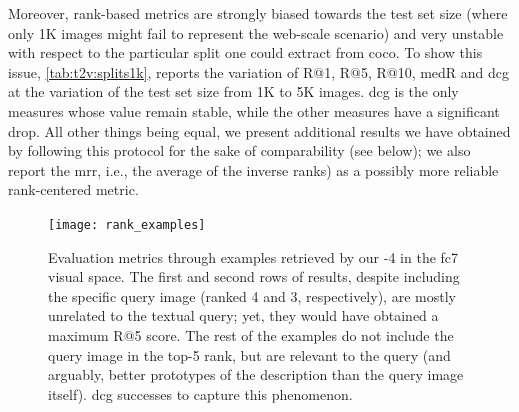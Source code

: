 Moreover, rank-based metrics are strongly biased towards the test set size (where only 1K images might fail to represent the web-scale scenario) and very unstable with respect to the particular split one could extract from \gls{coco}.
To show this issue, \ref{tab:t2v:splits1k}, reports the variation of R@1, R@5, R@10, \gls{medR} and \gls{dcg} at the variation of the test set size from 1K to 5K images.
\gls{dcg} is the only measures whose value remain stable, while the other measures have a significant drop.
All other things being equal, we present additional results we have obtained by following this protocol for the sake of comparability (see below);
we also report the \acrfull{mrr}, i.e.,  the average of the inverse ranks) as a possibly more reliable rank-centered metric.

\begin{figure}
 \texttt{[image: rank\_examples]}
 \caption{Evaluation metrics through examples retrieved by our \widedeepttv{}-4 in the fc7 visual space.
The first and second rows of results, despite including the specific query image (ranked 4 and 3, respectively), are mostly unrelated to the textual query;
 yet, they would have obtained a maximum R@5 score.
 The rest of the examples do not include the query image in the top-5 rank, but are relevant to the query (and arguably, better prototypes of the description than the query image itself).
 \gls{dcg} successes to capture this phenomenon.}
 \label{fig:t2v:metrics}
\end{figure}


